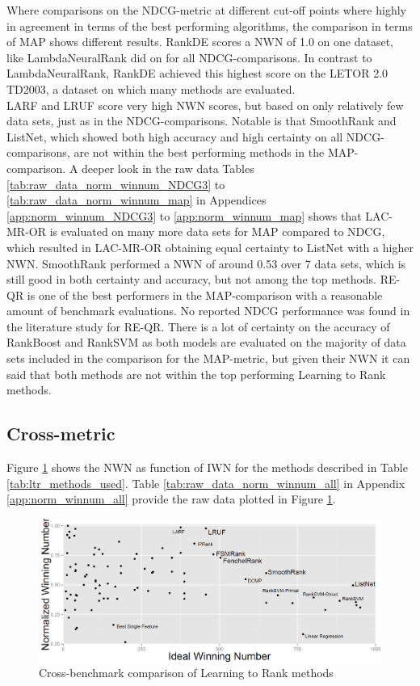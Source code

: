 Where comparisons on the \ac{NDCG}-metric at different cut-off points where highly in agreement in terms of the best performing algorithms, the comparison in terms of \ac{MAP} shows different results. RankDE scores a \ac{NWN} of 1.0 on one dataset, like LambdaNeuralRank did on for all \ac{NDCG}-comparisons. In contrast to LambdaNeuralRank, RankDE achieved this highest score on the LETOR 2.0 TD2003, a dataset on which many methods are evaluated.\\

LARF and LRUF score very high \ac{NWN} scores, but based on only relatively few data sets, just as in the \ac{NDCG}-comparisons. Notable is that SmoothRank and ListNet, which showed both high accuracy and high certainty on all \ac{NDCG}-comparisons, are not within the best performing methods in the \ac{MAP}-comparison. A deeper look in the raw data Tables \ref{tab:raw_data_norm_winnum_NDCG3} to \ref{tab:raw_data_norm_winnum_map} in Appendices \ref{app:norm_winnum_NDCG3} to \ref{app:norm_winnum_map} shows that LAC-MR-OR is evaluated on many more data sets for \ac{MAP} compared to \ac{NDCG}, which resulted in LAC-MR-OR obtaining equal certainty to ListNet with a higher \ac{NWN}. SmoothRank performed a \ac{NWN} of around 0.53 over 7 data sets, which is still good in both certainty and accuracy, but not among the top methods. RE-QR is one of the best performers in the \ac{MAP}-comparison with a reasonable amount of benchmark evaluations. No reported \ac{NDCG} performance was found in the literature study for RE-QR. There is a lot of certainty on the accuracy of RankBoost and Rank\ac{SVM} as both models are evaluated on the majority of data sets included in the comparison for the \ac{MAP}-metric, but given their \ac{NWN} it can said that both methods are not within the top performing Learning to Rank methods.

\subsection{Cross-metric}
Figure \ref{fig:normalised_winning_number_all} shows the \ac{NWN} as function of \ac{IWN} for the methods described in Table \ref{tab:ltr_methods_used}. Table \ref{tab:raw_data_norm_winnum_all} in Appendix \ref{app:norm_winnum_all} provide the raw data plotted in Figure \ref{fig:normalised_winning_number_all}.\\

\begin{figure}[!h]
\includegraphics[scale=0.33]{gfx/combined_normalized_winnum}
\caption{Cross-benchmark comparison of Learning to Rank methods}
\label{fig:normalised_winning_number_all}
\end{figure}

